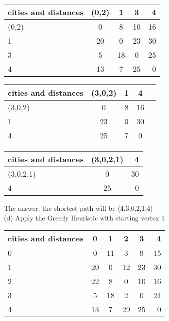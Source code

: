 \documentclass[12pt, letterpaper]{article}
\begin{document}
\begin{center} 
	
	\begin{tabular}{|l|| c|c| c| r|}
		\hline
		cities and distances & (0,2) & 1& 3 & 4 \\
		\hline \hline
		(0,2) & 0 & 8  & 10  & 16\\
		\hline
		1 &20& 0 &23& 30\\
		\hline
		3 &{\color{blue}5} &18 &0 &25\\
		\hline
		4 &13 &7 & 25& 0\\
		\hline
	\end{tabular}
\end{center}

\begin{center} 
	
	\begin{tabular}{|l|| c| c| c| r|}
		\hline
		cities and distances & (3,0,2) & 1 & 4 \\
		\hline \hline
		(3,0,2) & 0 & {\color{blue}8} & 16\\
		\hline
		1 &23 &0 &30\\
		\hline
		4 &25& 7& 0\\
		\hline
	\end{tabular}
\end{center}

\begin{center} 
	
	\begin{tabular}{|l|| c| r|}
		\hline
		cities and distances & (3,0,2,1)  & 4 \\
		\hline \hline
		(3,0,2,1) & 0 & 30\\
		\hline
		4 &{\color{blue}25}& 0\\
		\hline
	\end{tabular}
\end{center}
The answer:
the shortest path will be (4,3,0,2,1,4)\\

(d) Apply the Greedy Heuristic with starting vertex 1


\begin{center} 
	
	\begin{tabular}{|l|| c| c| c| c| r|}
		\hline
		cities and distances & 0 & 1 & 2 & 3 & 4 \\
		\hline \hline
		0 & 0 & 11 & 3  & 9 & 15\\
		\hline
		1 & 20 & 0 & 12 & 23 &30\\
		\hline
		2 &22& 8 &0 &10& 16\\
		\hline
		3 &5 &18 &{\color{blue}2} &0 &24\\
		\hline
		4 &13 &7 &29& 25& 0\\
		\hline
	\end{tabular}
\end{center}
\end{document}

